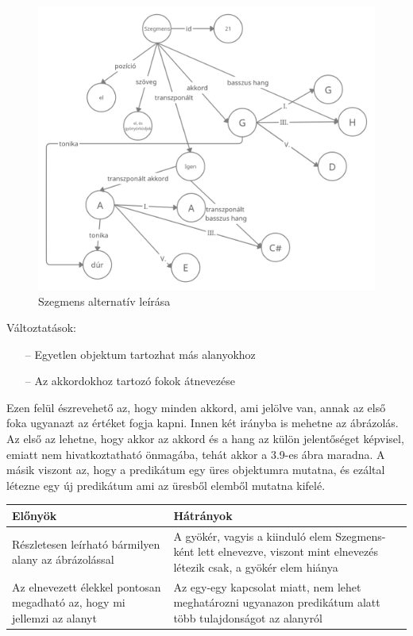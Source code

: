 \begin{figure}[h]
	\includegraphics[scale=0.26]{images/rdf_graph_7.png}
	\caption{Szegmens alternatív leírása}
	\label{fig:graph7}
\end{figure}
\newpage
Változtatások:
\begin{itemize}
	\item[--] Egyetlen objektum tartozhat más alanyokhoz
	\item[--] Az akkordokhoz tartozó fokok átnevezése
\end{itemize}

Ezen felül észrevehető az, hogy minden akkord, ami jelölve van, annak az első foka ugyanazt az értéket fogja kapni. Innen két irányba is mehetne az ábrázolás. Az első az lehetne, hogy akkor az akkord és a hang az külön jelentőséget képvisel, emiatt nem hivatkoztatható önmagába, tehát akkor a 3.9-es ábra maradna. A másik viszont az, hogy a predikátum egy üres objektumra mutatna, és ezáltal létezne egy új predikátum ami az üresből elemből mutatna kifelé.

\begin{center}
	\begin{tabular}{ |p{7cm}|p{7cm}| }
		\hline
		Előnyök & Hátrányok\\
		\hline
		Részletesen leírható bármilyen alany az ábrázolással & A gyökér, vagyis a kiinduló elem Szegmens-ként lett elnevezve, viszont mint elnevezés létezik csak, a gyökér elem hiánya \\ 
		\hline
		Az elnevezett élekkel pontosan megadható az, hogy mi jellemzi az alanyt & Az egy-egy kapcsolat miatt, nem lehet meghatározni ugyanazon predikátum alatt több tulajdonságot az alanyról\\
		\hline
	\end{tabular}
\end{center}

